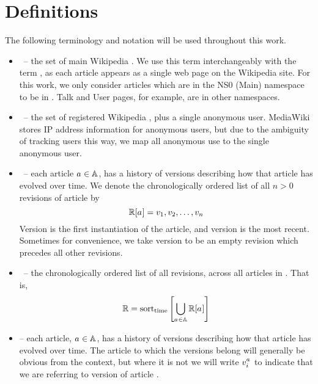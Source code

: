 
\chapter{Definitions}
\label{ch:defs}

The following terminology and notation
will be used throughout this work.

\renewcommand{\labelitemi}{}
\begin{itemize}
\item \articles \ -- the set of main Wikipedia .
    We use this term interchangeably with the term ,
    as each article appears as a single web page on the Wikipedia site.
    For this work, we only consider articles which are in
    the NS0 (Main) namespace to be in \articles.
    Talk and User pages, for example, are in other namespaces.
\item \users \ -- the set of registered Wikipedia ,
    plus a single anonymous user.
    MediaWiki stores IP address information for anonymous users,
    but due to the ambiguity of tracking users this way,
    we map all anonymous use to the single anonymous user.
\item \revisions{\article{}} \ -- each article $a_{} \in \mathbb{A}$,
    has a history of versions
    describing how that article has evolved over time.
    We denote the chronologically ordered list
    of all $n > 0$ revisions of article \article{} by
    \begin{equation}
	\revisions{\article{}} =
		\version{1}, \version{2}, \ldots, \version{n}
    \end{equation}
    Version  is the first instantiation of the article,
    and version  is the most recent.
    Sometimes for convenience, we take version  to be
    an empty revision which precedes all other revisions.
\item \revisions{} \ -- the chronologically ordered list of all
    revisions, across all articles in \articles.
    That is,
    \begin{equation}
    \revisions{} = \mathrm{sort}_\mathrm{time}\left[
	\bigcup_{\article{} \in \articles} \revisions{\article{}}
	\right]
    \end{equation}

\item {} -- each article, $a_{} \in \mathbb{A}$,
    has a history of versions
    describing how that article has evolved over time.
    The article to which the versions belong will generally be
    obvious from the context, but where it is not we will
    write $v_{i}^{a_{}}$ to indicate that we
    are referring to version  of article \article{}.
\end{itemize}
\renewcommand{\labelitemi}{$\bullet$}


